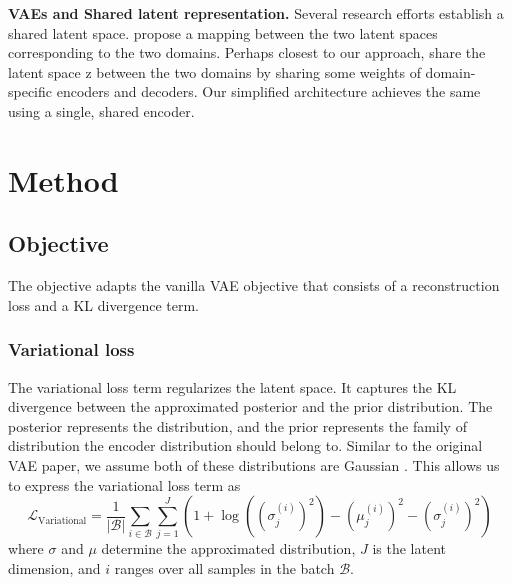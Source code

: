 \documentclass{article}
\begin{document}
\textbf{VAEs and Shared latent representation.} Several research efforts establish a shared latent space. \citet{zhao} propose a mapping between the two latent spaces corresponding to the two domains. Perhaps closest to our approach, \citet{liu} share the latent space z between the two domains by sharing some weights of domain-specific encoders and decoders. Our simplified architecture achieves the same using a single, shared encoder.

\section{Method}
\subsection{Objective}
The objective adapts the vanilla VAE objective that consists of a reconstruction loss and a KL divergence term.
\subsubsection{Variational loss}
The variational loss term regularizes the latent space. It captures the KL divergence between the approximated posterior and the prior distribution. The posterior represents the  distribution, and the prior represents the family of distribution the encoder distribution should belong to. Similar to the original VAE paper, we assume both of these distributions are Gaussian \citep{kingma}. This allows us to express the variational loss term as
\begin{equation}
  \mathcal{L}_{\text{Variational}}
    = \frac{1}{\left|\mathcal{B}\right|} \sum_{i \in \mathcal{B}} \sum_{j=1}^J \left(
      1
      + \log\left(
        \left(
          \sigma_j^{(i)}
        \right)^2
      \right)
      - \left(\mu_j^{(i)}\right)^2 
      - \left(\sigma_j^{(i)}\right)^2 
    \right)
\end{equation}
where $\sigma$ and $\mu$ determine the approximated  distribution, $J$ is the latent dimension, and $i$ ranges over all samples in the batch $\mathcal{B}$.
\end{document}
